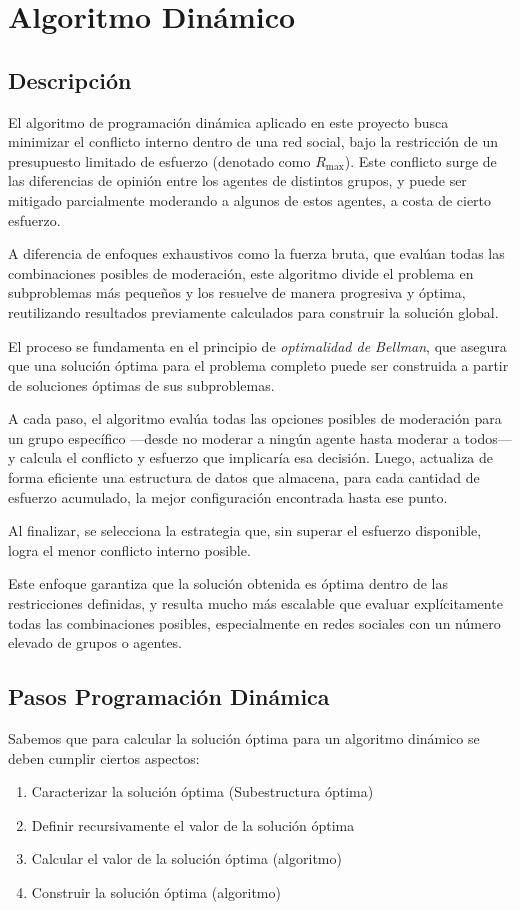 \documentclass[11pt,letter]{article}
\begin{document}
\newpage

\section{Algoritmo Dinámico}
\subsection{Descripción}

El algoritmo de programación dinámica aplicado en este proyecto busca minimizar el conflicto interno dentro de una red social, bajo la restricción de un presupuesto limitado de esfuerzo (denotado como $R_{\text{max}}$). Este conflicto surge de las diferencias de opinión entre los agentes de distintos grupos, y puede ser mitigado parcialmente moderando a algunos de estos agentes, a costa de cierto esfuerzo.

A diferencia de enfoques exhaustivos como la fuerza bruta, que evalúan todas las combinaciones posibles de moderación, este algoritmo divide el problema en subproblemas más pequeños y los resuelve de manera progresiva y óptima, reutilizando resultados previamente calculados para construir la solución global.

El proceso se fundamenta en el principio de \textit{optimalidad de Bellman}, que asegura que una solución óptima para el problema completo puede ser construida a partir de soluciones óptimas de sus subproblemas.

A cada paso, el algoritmo evalúa todas las opciones posibles de moderación para un grupo específico —desde no moderar a ningún agente hasta moderar a todos— y calcula el conflicto y esfuerzo que implicaría esa decisión. Luego, actualiza de forma eficiente una estructura de datos que almacena, para cada cantidad de esfuerzo acumulado, la mejor configuración encontrada hasta ese punto.

Al finalizar, se selecciona la estrategia que, sin superar el esfuerzo disponible, logra el menor conflicto interno posible.

Este enfoque garantiza que la solución obtenida es óptima dentro de las restricciones definidas, y resulta mucho más escalable que evaluar explícitamente todas las combinaciones posibles, especialmente en redes sociales con un número elevado de grupos o agentes.

\subsection{Pasos Programación Dinámica}
Sabemos que para calcular la solución óptima para un algoritmo dinámico se deben 
cumplir ciertos aspectos:
\begin{enumerate}
    \item Caracterizar la solución óptima (Subestructura óptima) 
    \item Definir recursivamente el valor de la solución óptima
    \item Calcular el valor de la solución óptima (algoritmo) 
    \item Construir la solución óptima (algoritmo)
\end{enumerate}
\end{document}
